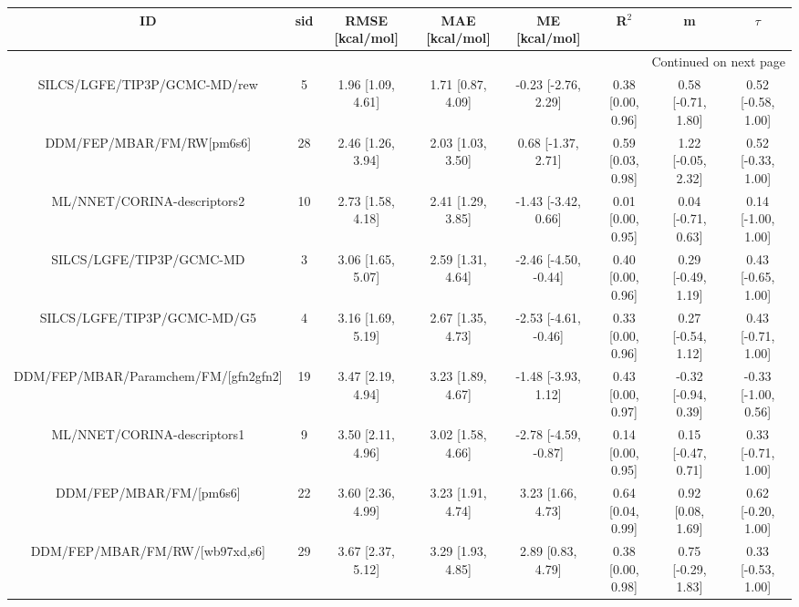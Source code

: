 \documentclass[8pt]{article}
\begin{document}
\begin{center}
\begin{footnotesize}
\begin{longtable}{|cccccccc|}
\toprule
                                       ID & sid &     RMSE [kcal/mol] &      MAE [kcal/mol] &         ME [kcal/mol] &              R$^2$ &                    m &               $\tau$ \\
\midrule
\endhead
\midrule
\multicolumn{8}{r}{{Continued on next page}} \\
\midrule
\endfoot

\bottomrule
\endlastfoot
             SILCS/LGFE/TIP3P/GCMC-MD/rew &   5 &   1.96 [1.09, 4.61] &   1.71 [0.87, 4.09] &   -0.23 [-2.76, 2.29] &  0.38 [0.00, 0.96] &   0.58 [-0.71, 1.80] &   0.52 [-0.58, 1.00] \\
                DDM/FEP/MBAR/FM/RW[pm6s6] &  28 &   2.46 [1.26, 3.94] &   2.03 [1.03, 3.50] &    0.68 [-1.37, 2.71] &  0.59 [0.03, 0.98] &   1.22 [-0.05, 2.32] &   0.52 [-0.33, 1.00] \\
              ML/NNET/CORINA-descriptors2 &  10 &   2.73 [1.58, 4.18] &   2.41 [1.29, 3.85] &   -1.43 [-3.42, 0.66] &  0.01 [0.00, 0.95] &   0.04 [-0.71, 0.63] &   0.14 [-1.00, 1.00] \\
                 SILCS/LGFE/TIP3P/GCMC-MD &   3 &   3.06 [1.65, 5.07] &   2.59 [1.31, 4.64] &  -2.46 [-4.50, -0.44] &  0.40 [0.00, 0.96] &   0.29 [-0.49, 1.19] &   0.43 [-0.65, 1.00] \\
              SILCS/LGFE/TIP3P/GCMC-MD/G5 &   4 &   3.16 [1.69, 5.19] &   2.67 [1.35, 4.73] &  -2.53 [-4.61, -0.46] &  0.33 [0.00, 0.96] &   0.27 [-0.54, 1.12] &   0.43 [-0.71, 1.00] \\
     DDM/FEP/MBAR/Paramchem/FM/[gfn2gfn2] &  19 &   3.47 [2.19, 4.94] &   3.23 [1.89, 4.67] &   -1.48 [-3.93, 1.12] &  0.43 [0.00, 0.97] &  -0.32 [-0.94, 0.39] &  -0.33 [-1.00, 0.56] \\
              ML/NNET/CORINA-descriptors1 &   9 &   3.50 [2.11, 4.96] &   3.02 [1.58, 4.66] &  -2.78 [-4.59, -0.87] &  0.14 [0.00, 0.95] &   0.15 [-0.47, 0.71] &   0.33 [-0.71, 1.00] \\
                  DDM/FEP/MBAR/FM/[pm6s6] &  22 &   3.60 [2.36, 4.99] &   3.23 [1.91, 4.74] &     3.23 [1.66, 4.73] &  0.64 [0.04, 0.99] &    0.92 [0.08, 1.69] &   0.62 [-0.20, 1.00] \\
           DDM/FEP/MBAR/FM/RW/[wb97xd,s6] &  29 &   3.67 [2.37, 5.12] &   3.29 [1.93, 4.85] &     2.89 [0.83, 4.79] &  0.38 [0.00, 0.98] &   0.75 [-0.29, 1.83] &   0.33 [-0.53, 1.00] \\

\end{longtable}
\end{footnotesize}
\end{center}
\end{document}
